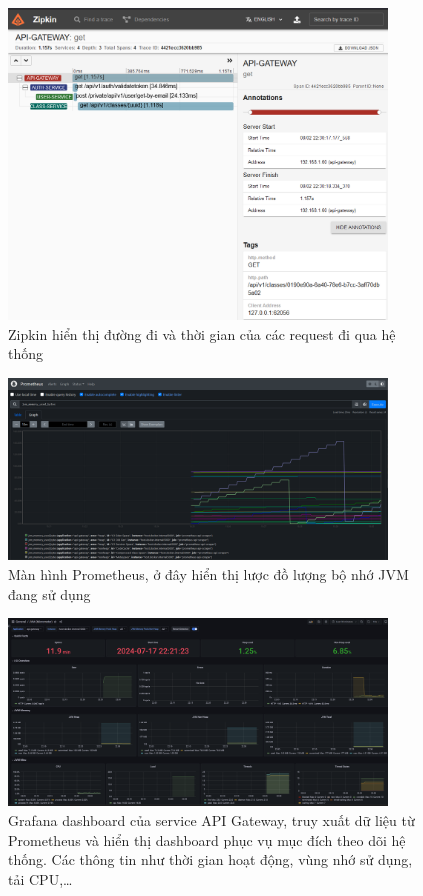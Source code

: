 \documentclass[report.tex]{subfiles}
\begin{document}
\begin{figure}[!htb]
{\centering
\includegraphics[width=380px]{../meta/ui.zipkin-2.png}
\caption[Màn hình Zipkin]{Zipkin hiển thị đường đi và thời gian của các request đi qua hệ thống}
\par
}
\end{figure}
\FloatBarrier

\begin{figure}[!htb]
{\centering
\includegraphics[width=380px]{../meta/ui.prometheus.png}
\caption[Màn hình Prometheus]{Màn hình Prometheus, ở đây hiển thị lược đồ lượng bộ nhớ JVM đang sử dụng}
\par
}
\end{figure}
\FloatBarrier

\begin{figure}[!htb]
{\centering
\includegraphics[width=380px]{../meta/ui.grafana.png}
\caption[Grafana dashboard]{Grafana dashboard của service API Gateway, truy xuất dữ liệu từ Prometheus và hiển thị dashboard phục vụ mục đích theo dõi hệ thống.
Các thông tin như thời gian hoạt động, vùng nhớ sử dụng, tải CPU,\dots}
\par
}
\end{figure}
\FloatBarrier
\end{document}
